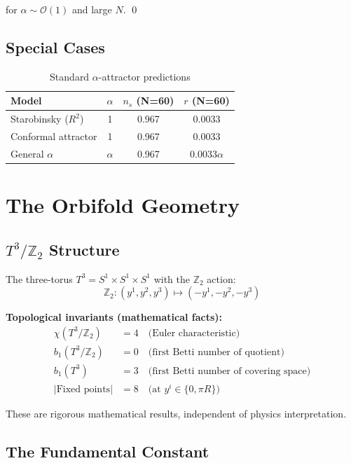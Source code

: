 \documentclass[12pt,a4paper]{article}
\begin{document}
for $\alpha \sim \mathcal{O}(1)$ and large $N$. \qed

\subsection{Special Cases}

\begin{table}[h]
\centering
\begin{tabular}{lccc}
\toprule
Model & $\alpha$ & $n_s$ (N=60) & $r$ (N=60) \\
\midrule
Starobinsky ($R^2$) & 1 & 0.967 & 0.0033 \\
Conformal attractor & 1 & 0.967 & 0.0033 \\
General $\alpha$ & $\alpha$ & 0.967 & $0.0033\alpha$ \\
\bottomrule
\end{tabular}
\caption{Standard $\alpha$-attractor predictions}
\end{table}

\section{The Orbifold Geometry}

\subsection{$T^3/\mathbb{Z}_2$ Structure}

The three-torus $T^3 = S^1 \times S^1 \times S^1$ with the $\mathbb{Z}_2$ action:
\begin{equation}
\mathbb{Z}_2: (y^1, y^2, y^3) \mapsto (-y^1, -y^2, -y^3)
\end{equation}

\textbf{Topological invariants (mathematical facts):}
\begin{align}
\chi(T^3/\mathbb{Z}_2) &= 4 \quad \text{(Euler characteristic)} \\
b_1(T^3/\mathbb{Z}_2) &= 0 \quad \text{(first Betti number of quotient)} \\
b_1(T^3) &= 3 \quad \text{(first Betti number of covering space)} \\
|\text{Fixed points}| &= 8 \quad \text{(at } y^i \in \{0, \pi R\}\text{)}
\end{align}

These are rigorous mathematical results, independent of physics interpretation.

\subsection{The Fundamental Constant}
\end{document}
